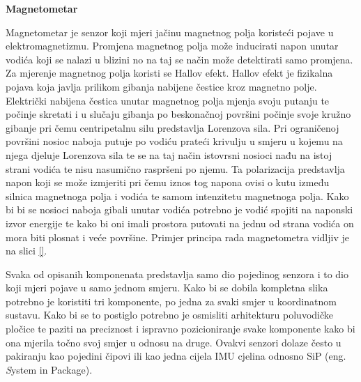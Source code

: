 \documentclass[times, utf8, diplomski]{fer}
\begin{document}

\textbf{Magnetometar}

Magnetometar je senzor koji mjeri jačinu magnetnog polja koristeći pojave u elektromagnetizmu. Promjena magnetnog polja može
inducirati napon unutar vodića koji se nalazi u blizini no na taj se način može detektirati samo promjena. Za mjerenje magnetnog
polja koristi se Hallov efekt. Hallov efekt je fizikalna pojava koja javlja prilikom gibanja nabijene čestice kroz magnetno polje.
Električki nabijena čestica unutar magnetnog polja mjenja svoju putanju te počinje skretati i u slučaju gibanja po beskonačnoj
površini počinje svoje kružno gibanje pri čemu centripetalnu silu predstavlja Lorenzova sila. Pri ograničenoj površini nosioc
naboja putuje po vodiću prateći krivulju u smjeru u kojemu na njega djeluje Lorenzova sila te se na taj način istovrsni nosioci
nađu na istoj strani vodića te nisu nasumično raspršeni po njemu. Ta polarizacija predstavlja napon koji se može izmjeriti pri
čemu iznos tog napona ovisi o kutu između silnica magnetnoga polja i vodića te samom intenzitetu magnetnoga polja. Kako bi bi se 
nosioci naboja gibali unutar vodića potrebno je vodić spojiti na naponski izvor energije te kako bi oni imali prostora putovati na 
jednu od strana vodića on mora biti plosnat i veće površine. Primjer principa rada magnetometra vidljiv je na slici \ref{}.


Svaka od opisanih komponenata predstavlja samo dio pojedinog senzora i to dio koji mjeri pojave u samo jednom smjeru. Kako bi se
dobila kompletna slika potrebno je koristiti tri komponente, po jedna za svaki smjer u koordinatnom sustavu. Kako bi se to postiglo
potrebno je osmisliti arhitekturu poluvodičke pločice te paziti na preciznost i ispravno pozicioniranje svake komponente kako bi
ona mjerila točno svoj smjer u odnosu na druge. Ovakvi senzori dolaze često u pakiranju kao pojedini čipovi ili kao jedna cijela
IMU cjelina odnosno SiP (eng. \textit System in Package).
\end{document}
